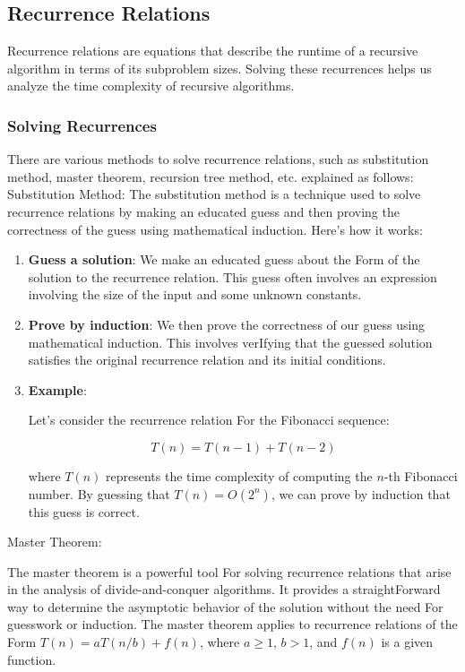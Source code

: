 \documentclass[12pt]{book} %
\begin{document}
\subsection{Recurrence Relations}

Recurrence relations are equations that describe the runtime of a recursive algorithm in terms of its subproblem sizes. Solving these recurrences helps us analyze the time complexity of recursive algorithms.

\subsubsection{Solving Recurrences}

There are various methods to solve recurrence relations, such as substitution method, master theorem, recursion tree method, etc. explained as follows:
\FloatBarrier
Substitution Method:
\FloatBarrier
The substitution method is a technique used to solve recurrence relations by making an educated guess and then proving the correctness of the guess using mathematical induction. Here's how it works:

\begin{enumerate}
    \item \textbf{Guess a solution}: We make an educated guess about the Form of the solution to the recurrence relation. This guess often involves an expression involving the size of the input and some unknown constants.
    
    \item \textbf{Prove by induction}: We then prove the correctness of our guess using mathematical induction. This involves verIfying that the guessed solution satisfies the original recurrence relation and its initial conditions.
    
    \item \textbf{Example}:
    
    Let's consider the recurrence relation For the Fibonacci sequence:
    
    \[
    T(n) = T(n-1) + T(n-2)
    \]
    
    where \(T(n)\) represents the time complexity of computing the \(n\)-th Fibonacci number. By guessing that \(T(n) = O(2^n)\), we can prove by induction that this guess is correct.
\end{enumerate}
\FloatBarrier
Master Theorem:
\FloatBarrier

The master theorem is a powerful tool For solving recurrence relations that arise in the analysis of divide-and-conquer algorithms. It provides a straightForward way to determine the asymptotic behavior of the solution without the need For guesswork or induction. The master theorem applies to recurrence relations of the Form \(T(n) = aT(n/b) + f(n)\), where \(a \geq 1\), \(b > 1\), and \(f(n)\) is a given function.
\end{document}
